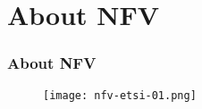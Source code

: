 \section{About NFV}

\begin{frame}
\frametitle{About NFV}

\begin{center}
  \begin{figure}
    \texttt{[image: nfv-etsi-01.png]}
  \end{figure}
\end{center}

\end{frame}
